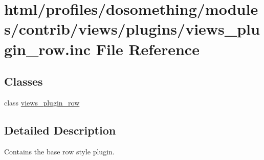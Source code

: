 \hypertarget{views__plugin__row_8inc}{
\section{html/profiles/dosomething/modules/contrib/views/plugins/views\_\-plugin\_\-row.inc File Reference}
\label{views__plugin__row_8inc}
}
\subsection*{Classes}
\begin{DoxyCompactItemize}
\item 
class \hyperlink{classviews__plugin__row}{views\_\-plugin\_\-row}
\end{DoxyCompactItemize}


\subsection{Detailed Description}
Contains the base row style plugin. 